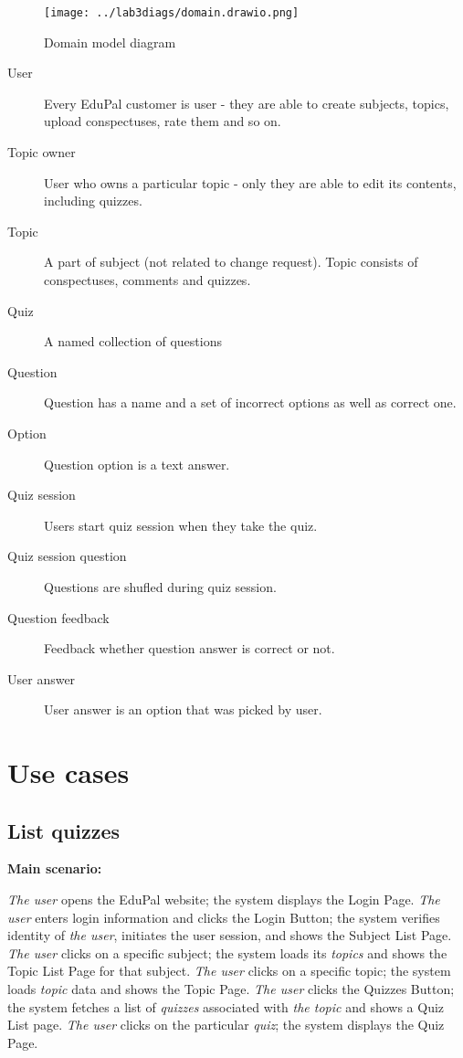 \documentclass[
    english, %
]{VUMIFPSkursinis}
\begin{document}
\begin{figure}[ht]
    \centering
    \texttt{[image: ../lab3diags/domain.drawio.png]}
    \caption{Domain model diagram}
    \label{domain-model}
\end{figure}

\begin{description}
    \item[User] Every EduPal customer is user - they are able to create subjects, topics, upload conspectuses, rate them and so on.
    \item[Topic owner] User who owns a particular topic - only they are able to edit its contents, including quizzes.
    \item[Topic] A part of subject (not related to change request). Topic consists of conspectuses, comments and quizzes.
    \item[Quiz] A named collection of questions
    \item[Question] Question has a name and a set of incorrect options as well as correct one.
    \item[Option] Question option is a text answer.
    \item[Quiz session] Users start quiz session when they take the quiz.
    \item[Quiz session question] Questions are shufled during quiz session.
    \item[Question feedback] Feedback whether question answer is correct or not.
    \item[User answer] User answer is an option that was picked by user.
\end{description}

\section{Use cases}

\subsection{List quizzes}

\noindent\textbf{\fontsize{13}{15}\selectfont Main scenario:}

\textit{The user} opens the EduPal website; the system displays the Login Page. \textit{The user} enters login information and clicks the Login Button; the system verifies identity of \textit{the user}, initiates the user session, and shows the Subject List Page. \textit{The user} clicks on a specific subject; the system loads its \textit{topics} and shows the Topic List Page for that subject. \textit{The user} clicks on a specific topic; the system loads \textit{topic} data and shows the Topic Page. \textit{The user} clicks the Quizzes Button; the system fetches a list of \textit{quizzes} associated with \textit{the topic} and shows a Quiz List page. \textit{The user} clicks on the particular \textit{quiz}; the system displays the Quiz Page.
\end{document}
